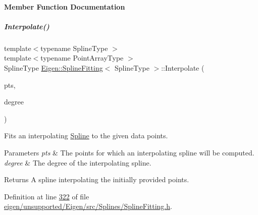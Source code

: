 \paragraph{Member Function Documentation}
\mbox{\label{group___splines___module_adc80b6f0dd0dbbea28130fb254626874}} 
\subparagraph{\texorpdfstring{Interpolate()}{Interpolate()}\hspace{0.1cm}{\footnotesize\ttfamily [1/4]}}
{\footnotesize\ttfamily template$<$typename Spline\+Type $>$ \\
template$<$typename Point\+Array\+Type $>$ \\
Spline\+Type \hyperlink{group___splines___module_struct_eigen_1_1_spline_fitting}{Eigen\+::\+Spline\+Fitting}$<$ Spline\+Type $>$\+::Interpolate (\begin{DoxyParamCaption}\item[{const Point\+Array\+Type \&}]{pts,  }\item[{Dense\+Index}]{degree }\end{DoxyParamCaption})\hspace{0.3cm}{\ttfamily [static]}}



Fits an interpolating \hyperlink{group___splines___module_class_eigen_1_1_spline}{Spline} to the given data points. 


\begin{DoxyParams}{Parameters}
{\em pts} & The points for which an interpolating spline will be computed. \\
\hline
{\em degree} & The degree of the interpolating spline.\\
\hline
\end{DoxyParams}
\begin{DoxyReturn}{Returns}
A spline interpolating the initially provided points. 
\end{DoxyReturn}


Definition at line \hyperlink{eigen_2unsupported_2_eigen_2src_2_splines_2_spline_fitting_8h_source_l00322}{322} of file \hyperlink{eigen_2unsupported_2_eigen_2src_2_splines_2_spline_fitting_8h_source}{eigen/unsupported/\+Eigen/src/\+Splines/\+Spline\+Fitting.\+h}.

